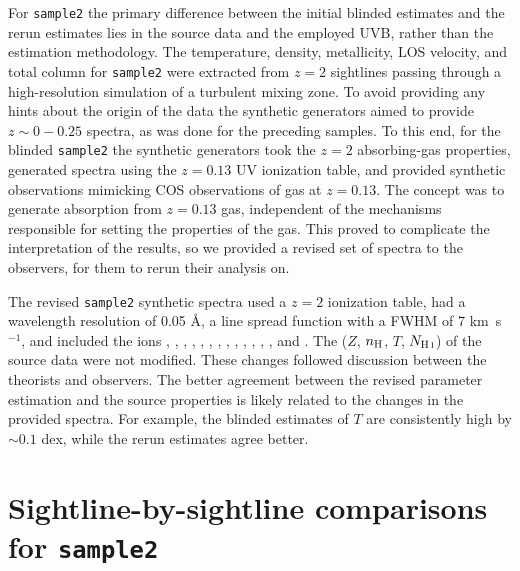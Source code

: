 \documentclass[fleqn,usenatbib]{mnras}
\newcommand{\NHI}{N_{\ion{H}{I}}}
\def\kms{\hbox{km~s$^{-1}$}}
\begin{document}
For \texttt{sample2} the primary difference between the initial blinded estimates and the rerun estimates lies in the source data and the employed UVB,
rather than the estimation methodology.
The temperature, density, metallicity, LOS velocity, and total column for \texttt{sample2} were extracted from $z=2$ sightlines passing through a high-resolution simulation of a turbulent mixing zone.
To avoid providing any hints about the origin of the data the synthetic generators aimed to provide $z \sim 0 - 0.25$ spectra,
as was done for the preceding samples.
To this end, for the blinded \texttt{sample2} the synthetic generators took the $z=2$ absorbing-gas properties,
generated spectra using the $z=0.13$ UV ionization table,
and provided synthetic observations mimicking COS observations of gas at $z=0.13$.
The concept was to generate absorption from $z=0.13$ gas,
independent of the mechanisms responsible for setting the properties of the gas.
This proved to complicate the interpretation of the results, so we provided a revised set of spectra to the observers, for them to rerun their analysis on.

The revised \texttt{sample2} synthetic spectra used a $z=2$ ionization table,
had a wavelength resolution of 0.05 \AA,
a line spread function with a FWHM of 7 {\kms},
and included the ions , , , , , , , , , , , , , and .
The ($Z$, $n_{\rm H}$, $T$, $\NHI$) of the source data were not modified.
These changes followed discussion between the theorists and observers.
The better agreement between the revised parameter estimation and the source properties is likely related to the changes in the provided spectra.
For example, the blinded estimates of $T$ are consistently high by $\sim 0.1$ dex,
while the rerun estimates agree better.

\section{Sightline-by-sightline comparisons for \texttt{sample2}}
\label{a: all sightlines for sample2}
\end{document}
